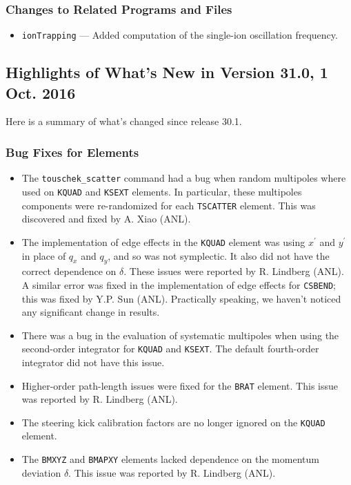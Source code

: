 \documentclass[11pt]{article}
\begin{document}
\subsubsection{Changes to Related Programs and Files}

\begin{itemize}
\item \verb|ionTrapping| --- Added computation of the single-ion oscillation frequency.
\end{itemize}

\subsection{Highlights of What's New in Version 31.0, 1 Oct. 2016}

Here is a summary of what's changed since release 30.1.

\subsubsection{Bug Fixes for Elements}

\begin{itemize}
\item The \verb|touschek_scatter| command had a bug when random multipoles where used on \verb|KQUAD| and \verb|KSEXT| elements. In particular,
  these multipoles components were re-randomized for each \verb|TSCATTER| element. This was discovered and fixed by A. Xiao (ANL).
\item The implementation of edge effects in the \verb|KQUAD| element was using $x^\prime$ and $y^\prime$ in place of $q_x$ and $q_y$, and so
  was not symplectic. It also did not have the correct dependence on $\delta$. 
  These issues were reported by R. Lindberg (ANL).  A similar error was fixed in the implementation of edge effects for \verb|CSBEND|;
  this was fixed by Y.P. Sun (ANL). Practically speaking, we haven't noticed any significant change in results.
\item There was a bug in the evaluation of systematic multipoles when using the second-order integrator for \verb|KQUAD| and \verb|KSEXT|.
  The default fourth-order integrator did not have this issue.
\item Higher-order path-length issues were fixed for the \verb|BRAT| element. This issue was reported by R. Lindberg (ANL).
\item The steering kick calibration factors are no longer ignored on the \verb|KQUAD| element.
\item The \verb|BMXYZ| and \verb|BMAPXY| elements lacked dependence on the momentum deviation $\delta$. This issue was reported by R. Lindberg (ANL).
\end{itemize}
\end{document}
